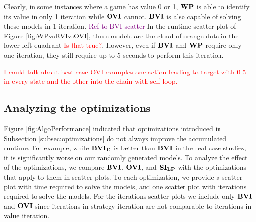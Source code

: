 Clearly, in some instances where a game has value 0 or 1, $\mathbf{WP}$ is able to identify its value in only 1 iteration while $\mathbf{OVI}$ cannot.
$\mathbf{BVI}$ is also capable of solving these models in 1 iteration. \textcolor{purple}{Ref to BVI scatter}
In the runtime scatter plot of Figure \ref{fig:WPvsBVIvsOVI}, these models are the cloud of orange dots in the lower left quadrant \textcolor{red}{Is that true?}.
However, even if $\mathbf{BVI}$ and $\mathbf{WP}$ require only one iteration, they still require up to 5 seconds to perform this iteration.

\textcolor{red}{I could talk about best-case OVI examples one action leading to target with 0.5 in every state and the other into the chain with self loop.}

\subsection{Analyzing the optimizations}

Figure \ref{fig:AlgoPerformance} indicated that optimizations introduced in Subsection \ref{subsec:optimizations} do not always improve the accumulated runtime. 
For example, while $\mathbf{BVI_D}$ is better than $\mathbf{BVI}$ in the real case studies, it is significantly worse on our randomly generated models.
To analyze the effect of the optimizations, we compare $\mathbf{BVI}$, $\mathbf{OVI}$, and $\mathbf{SI_{LP}}$ with the optimizations that apply to them in scatter plots.
To each optimization, we provide a scatter plot with time required to solve the models, and one scatter plot with iterations required to solve the models.
For the iterations scatter plots we include only $\mathbf{BVI}$ and $\mathbf{OVI}$ since iterations in strategy iteration are not comparable to iterations in value iteration.

